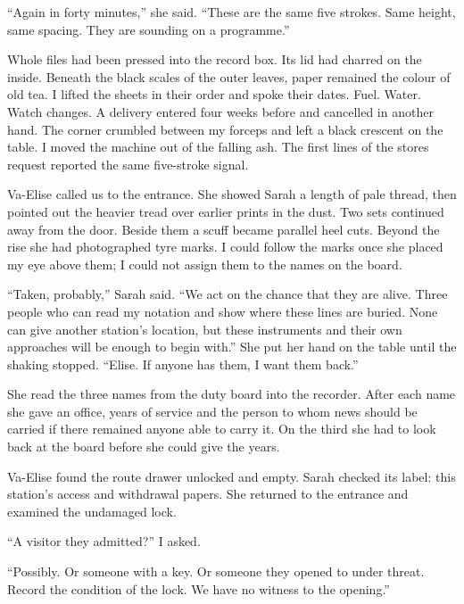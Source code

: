 ``Again in forty minutes,'' she said. ``These are the same five strokes. Same height, same spacing. They are sounding on a programme.''\par

Whole files had been pressed into the record box. Its lid had charred on the inside. Beneath the black scales of the outer leaves, paper remained the colour of old tea. I lifted the sheets in their order and spoke their dates. Fuel. Water. Watch changes. A delivery entered four weeks before and cancelled in another hand. The corner crumbled between my forceps and left a black crescent on the table. I moved the machine out of the falling ash. The first lines of the stores request reported the same five-stroke signal.\par

Va-Elise called us to the entrance. She showed Sarah a length of pale thread, then pointed out the heavier tread over earlier prints in the dust. Two sets continued away from the door. Beside them a scuff became parallel heel cuts. Beyond the rise she had photographed tyre marks. I could follow the marks once she placed my eye above them; I could not assign them to the names on the board.\par

``Taken, probably,'' Sarah said. ``We act on the chance that they are alive. Three people who can read my notation and show where these lines are buried. None can give another station's location, but these instruments and their own approaches will be enough to begin with.'' She put her hand on the table until the shaking stopped. ``Elise. If anyone has them, I want them back.''\par

She read the three names from the duty board into the recorder. After each name she gave an office, years of service and the person to whom news should be carried if there remained anyone able to carry it. On the third she had to look back at the board before she could give the years.\par

Va-Elise found the route drawer unlocked and empty. Sarah checked its label: this station's access and withdrawal papers. She returned to the entrance and examined the undamaged lock.\par

``A visitor they admitted?'' I asked.\par

``Possibly. Or someone with a key. Or someone they opened to under threat. Record the condition of the lock. We have no witness to the opening.''\par

